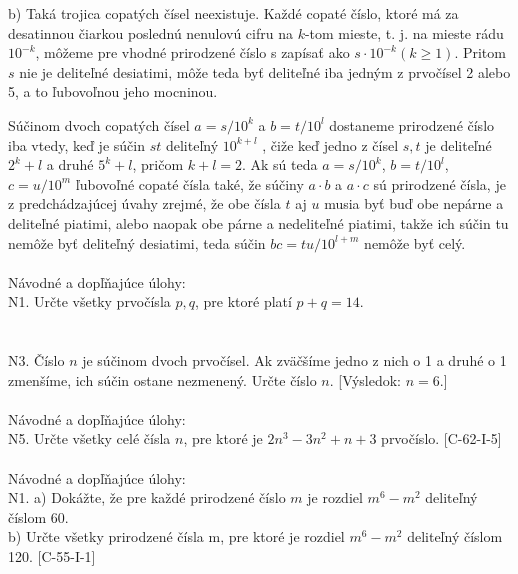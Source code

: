 b) Taká trojica copatých čísel neexistuje. Každé copaté číslo, ktoré má za desatinnou čiarkou poslednú nenulovú cifru na $k$-tom mieste, t. j. na mieste rádu $10^{-k}$, môžeme pre vhodné prirodzené číslo s zapísať ako $s \cdot 10^{-k} (k \geq 1)$. Pritom $s$ nie je deliteľné desiatimi, môže teda byť deliteľné iba  jedným z prvočísel 2 alebo 5, a to ľubovoľnou jeho mocninou.

Súčinom dvoch copatých čísel $a = s/10^k$ a $b = t/10^l$ dostaneme prirodzené číslo iba vtedy, keď je súčin $st$ deliteľný $10^{k+l}$ , čiže keď jedno z čísel $s, t$ je deliteľné $2^k+l$ a druhé $5^k+l$, pričom $k + l = 2$. Ak sú teda $a = s/10^k$, $b = t/10^l$, $c = u/10^m$ ľubovoľné copaté čísla také, že súčiny $a \cdot b$ a $a \cdot c$ sú prirodzené čísla, je z predchádzajúcej úvahy zrejmé, že obe čísla $t$ aj $u$ musia byť buď obe nepárne a deliteľné piatimi, alebo naopak obe párne a nedeliteľné piatimi, takže ich súčin tu nemôže byť deliteľný desiatimi, teda súčin $bc = tu/10^{l+m}$ nemôže byť celý.\\
\\
Návodné a dopľňajúce úlohy:\\

N1. Určte všetky prvočísla $p, q$, pre ktoré platí $p + q = 14$.\\
\\

\\
N3. Číslo $n$ je súčinom dvoch prvočísel. Ak zväčšíme jedno z nich o 1 a druhé o 1 zmenšíme, ich súčin ostane nezmenený. Určte číslo $n$. [Výsledok: $n = 6$.]\\
\\

Návodné a dopľňajúce úlohy:\\

N5. Určte všetky celé čísla $n$, pre ktoré je $2n^3 - 3n^2+ n + 3$ prvočíslo. [C-62-I-5]\\
\\

Návodné a dopľňajúce úlohy:\\
N1. a) Dokážte, že pre každé prirodzené číslo $m$ je rozdiel $m^6 - m^2$ deliteľný číslom 60.\\
b) Určte všetky prirodzené čísla m, pre ktoré je rozdiel $m^6 - m^2$ deliteľný číslom 120. [C-55-I-1] \\
\\

